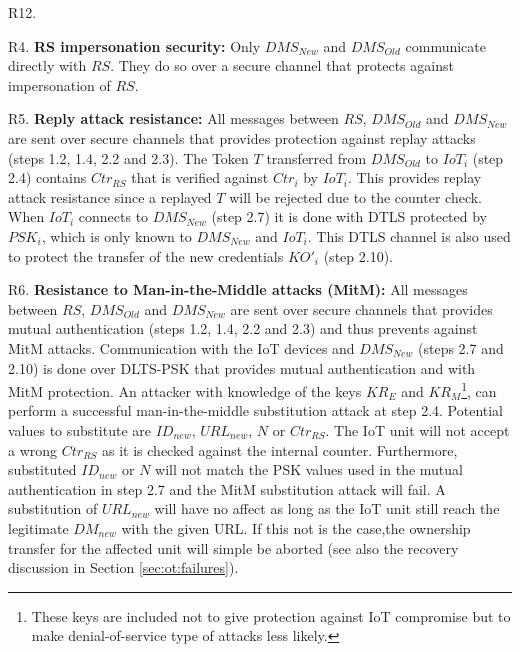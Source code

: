 {\begin{labeling}{R12.}
\item [R4.] \textbf{RS impersonation security:} %
Only $DMS_{New}$ and $DMS_{Old}$ communicate directly with $RS$. They do so over a secure channel that protects against impersonation of $RS$.
\item [R5.] \textbf{Reply attack resistance:} %
All messages between $RS$, $DMS_{Old}$ and $DMS_{New}$ are sent over secure channels that provides protection against replay attacks (steps 1.2, 1.4, 2.2 and 2.3). The Token $T$ transferred from $DMS_{Old}$ to $IoT_i$ (step 2.4) contains $Ctr_{RS}$ that is verified against $Ctr_{i}$ by $IoT_i$. This provides replay attack resistance since a replayed $T$ will be rejected due to the counter check. When $IoT_i$ connects to $DMS_{New}$ (step 2.7) it is done with DTLS protected by $PSK_i$, which is only known to $DMS_{New}$ and $IoT_i$. This DTLS channel is also used to protect the transfer of the new credentials $KO'_i$ (step 2.10).
\item [R6.] \textbf{Resistance to Man-in-the-Middle attacks (MitM):} %
All messages between $RS$, $DMS_{Old}$ and $DMS_{New}$ are sent over secure channels that provides mutual authentication (steps 1.2, 1.4, 2.2 and 2.3) and thus prevents against MitM attacks. Communication with the IoT devices and $DMS_{New}$ (steps 2.7 and 2.10) is done over DLTS-PSK that provides mutual authentication and with MitM protection. An attacker with knowledge of the keys $KR_E$ and $KR_M$\footnote{These keys are included not to give protection against IoT compromise but to make denial-of-service type of attacks less likely.}, can perform a successful man-in-the-middle substitution attack at step 2.4. Potential values to substitute are $ID_{new}$, $URL_{new}$, $N$ or $Ctr_{RS}$. The IoT unit will not accept a wrong $Ctr_{RS}$ as it is checked against the internal counter. Furthermore, substituted $ID_{new}$ or $N$ will not match the PSK values used in the mutual authentication in step 2.7 and the MitM substitution attack will fail. A substitution of $URL_{new}$ will have no affect as long as the IoT unit still reach the legitimate $DM_{new}$ with the given URL. If this not is the case,the ownership transfer for the affected unit will simple be aborted (see also the recovery discussion in Section \ref{sec:ot:failures}).


\end{labeling}}
